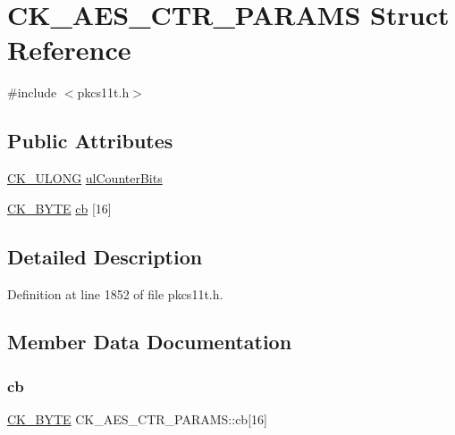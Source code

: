 \hypertarget{struct_c_k___a_e_s___c_t_r___p_a_r_a_m_s}{}\section{C\+K\+\_\+\+A\+E\+S\+\_\+\+C\+T\+R\+\_\+\+P\+A\+R\+A\+MS Struct Reference}
\label{struct_c_k___a_e_s___c_t_r___p_a_r_a_m_s}


{\ttfamily \#include $<$pkcs11t.\+h$>$}

\subsection*{Public Attributes}
\begin{DoxyCompactItemize}
\item 
\hyperlink{pkcs11t_8h_a35181858a3b7a0a81f49d180d8f446ef}{C\+K\+\_\+\+U\+L\+O\+NG} \hyperlink{struct_c_k___a_e_s___c_t_r___p_a_r_a_m_s_a54e9e91f82b31a9cbe343adaa31e3a3a}{ul\+Counter\+Bits}
\item 
\hyperlink{pkcs11t_8h_a51e605f881c86838bf12d70707b57b85}{C\+K\+\_\+\+B\+Y\+TE} \hyperlink{struct_c_k___a_e_s___c_t_r___p_a_r_a_m_s_ac56cd88bc06e232dd34f41843c7f8498}{cb} \mbox{[}16\mbox{]}
\end{DoxyCompactItemize}


\subsection{Detailed Description}


Definition at line 1852 of file pkcs11t.\+h.



\subsection{Member Data Documentation}
\mbox{\label{struct_c_k___a_e_s___c_t_r___p_a_r_a_m_s_ac56cd88bc06e232dd34f41843c7f8498}} 
\subsubsection{\texorpdfstring{cb}{cb}}
{\footnotesize\ttfamily \hyperlink{pkcs11t_8h_a51e605f881c86838bf12d70707b57b85}{C\+K\+\_\+\+B\+Y\+TE} C\+K\+\_\+\+A\+E\+S\+\_\+\+C\+T\+R\+\_\+\+P\+A\+R\+A\+M\+S\+::cb\mbox{[}16\mbox{]}}



